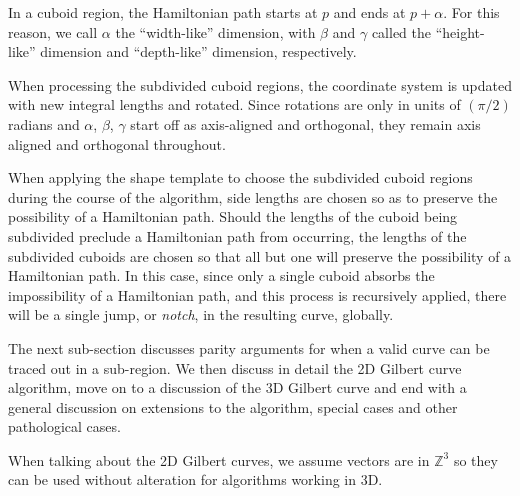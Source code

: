 In a cuboid region, the Hamiltonian path starts at $p$ and ends at $p + \alpha$.
For this reason, we call $\alpha$ the ``width-like'' dimension, with $\beta$ and $\gamma$
called the ``height-like'' dimension and ``depth-like'' dimension, respectively.

When processing the subdivided cuboid regions, the coordinate system is updated
with new integral lengths and rotated.
Since rotations are only in units of $(\pi/2)$ radians and $\alpha$, $\beta$, $\gamma$ start
off as axis-aligned and orthogonal, they remain axis aligned and orthogonal throughout.

When applying the shape template to choose the subdivided cuboid regions during the course of the
algorithm, side lengths are chosen so as to preserve the possibility of a Hamiltonian path.
Should the lengths of the cuboid being subdivided preclude a Hamiltonian path from occurring, the lengths
of the subdivided cuboids are chosen
so that all but one will preserve the possibility of a Hamiltonian path.
In this case, since only a single cuboid absorbs the impossibility of a Hamiltonian path,
and this process is recursively applied, there will be a single jump, or \textit{notch},
in the resulting curve, globally.


The next sub-section discusses parity arguments for when a valid curve can be
traced out in a sub-region.
We then discuss in detail the 2D Gilbert curve algorithm, move on to a discussion of the 3D Gilbert curve
and end with a general discussion on extensions to the algorithm, special cases and other pathological cases.

When talking about the 2D Gilbert curves, we assume vectors are in $\mathbb{Z}^3$
so they can be used without alteration for algorithms working in 3D.


